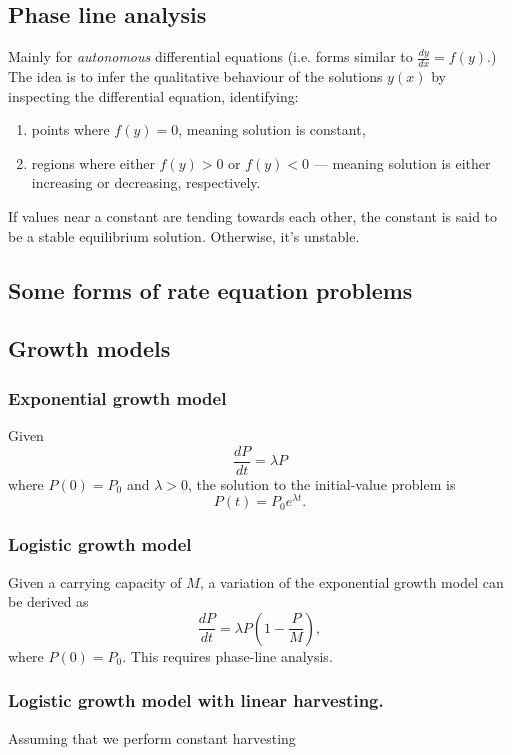 \documentclass[main.tex]{subfiles}
\begin{document}
	\subsection*{Phase line analysis}
	Mainly for \emph{autonomous} differential equations (i.e. forms similar to \(\frac{dy}{dx} = f(y)\).)
	The idea is to infer the qualitative behaviour of the solutions \(y(x)\) by inspecting the differential equation, identifying:
	\begin{enumerate}
	\item points where \(f(y) = 0\), meaning solution is constant,
	\item regions where either \(f(y) > 0\) or \(f(y) < 0\) --- meaning solution is either increasing or decreasing, respectively.
	\end{enumerate}

	If values near a constant are tending towards each other, the constant is said to be a stable equilibrium solution. Otherwise, it's unstable.

	\subsection*{Some forms of rate equation problems}

	\subsection*{Growth models}
	\subsubsection*{Exponential growth model}
	Given \[\frac{dP}{dt} = \lambda P\] where \(P(0) = P_0\) and \(\lambda > 0\), the solution to the initial-value problem is
	\[P(t) = P_0e^{\lambda t}.\]

	\subsubsection*{Logistic growth model}
	Given a carrying capacity of \(M\), a variation of the exponential growth model can be derived as \[\frac{dP}{dt} = \lambda P \left(1 - \frac{P}{M}\right),\] where \(P(0) = P_0.\) This requires phase-line analysis.

	\subsubsection*{Logistic growth model with linear harvesting.}
	Assuming that we perform constant harvesting 


\ifSubfilesClassLoaded{%
\end{multicols}
}{}
\end{document}
